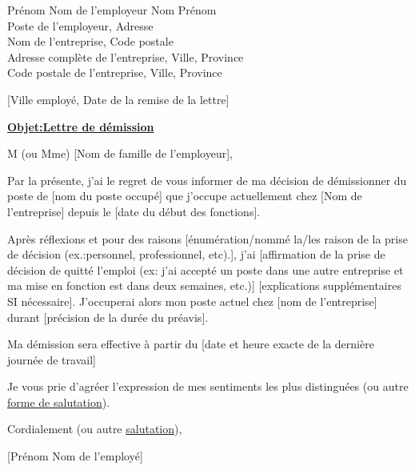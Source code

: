 \documentclass[twoside,letterpaper,12pt]{article}
\begin{document}
\begin{flushleft}

Prénom Nom de l'employeur \hfill Nom Prénom \\
Poste de l'employeur, \hfill Adresse \\
Nom de l'entreprise, \hfill Code postale\\
Adresse complète de l'entreprise, \hfill Ville, Province\\
Code postale de l'entreprise, Ville, Province

\vspace{20mm}

\hfill [Ville employé, Date de la remise de la lettre]

\vspace{10mm}

\begin{center}

{\large{\underline{\textbf{Objet:Lettre de démission}}}}

\end{center}

\vspace{8mm}

M (ou Mme) [Nom de famille de l'employeur],

\vspace{5mm}

Par la présente, j'ai le regret de vous informer de ma décision de démissionner du poste de [nom du poste occupé] que j'occupe actuellement chez [Nom de l'entreprise] depuis le [date du début des fonctions].

\vspace{5mm}

Après réflexions et pour des raisons [énumération/nommé la/les raison de la prise de décision (ex.:personnel, professionnel, etc).], j'ai [affirmation de la prise de décision de quitté l'emploi (ex: j'ai accepté un poste dans une autre entreprise et ma mise en fonction est dans deux semaines, etc.)] [explications supplémentaires SI nécessaire]. J'occuperai alors mon poste actuel chez [nom de l'entreprise] durant [précision de la durée du préavis].

\vspace{5mm}

Ma démission sera effective à partir du [date et heure exacte de la dernière journée de travail]

\vspace{5mm}

Je vous prie d'agréer l'expression de mes sentiments les plus distinguées (ou autre \underline{forme de salutation}).

\vspace{5mm}

Cordialement (ou autre \underline{salutation}),

\vspace{20mm}

[Prénom Nom de l'employé]

\end{flushleft}
\end{document}
